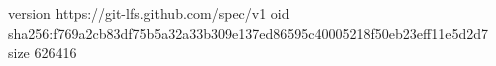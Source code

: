 version https://git-lfs.github.com/spec/v1
oid sha256:f769a2cb83df75b5a32a33b309e137ed86595c40005218f50eb23eff11e5d2d7
size 626416
